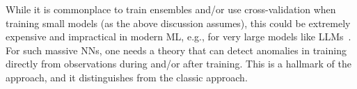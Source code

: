 While it is commonplace to train ensembles and/or use cross-validation when training small models (as the above discussion assumes),
this could be extremely expensive and impractical in modern ML, e.g., for very large models like LLMs~\cite{LLMS}.
For such massive NNs, one needs a theory that can detect anomalies in training directly from observations during and/or after training.
This is a hallmark of the \SETOL approach, and it distinguishes \SETOL from the classic \STATMECH approach.


